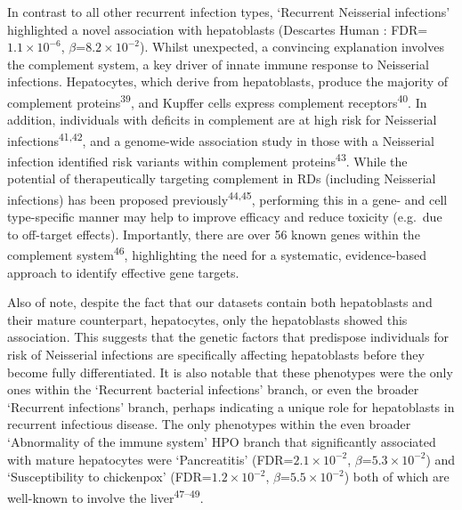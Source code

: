 \documentclass[
]{article}
\begin{document}
In contrast to all other recurrent infection types, `Recurrent
Neisserial infections' highlighted a novel association with hepatoblasts
(Descartes Human : FDR=\(1.1 \times 10^{-6}\),
\(\beta\)=\(8.2 \times 10^{-2}\)). Whilst unexpected, a convincing
explanation involves the complement system, a key driver of innate
immune response to Neisserial infections. Hepatocytes, which derive from
hepatoblasts, produce the majority of complement
proteins\textsuperscript{39}, and Kupffer cells express complement
receptors\textsuperscript{40}. In addition, individuals with deficits in
complement are at high risk for Neisserial
infections\textsuperscript{41,42}, and a genome-wide association study
in those with a Neisserial infection identified risk variants within
complement proteins\textsuperscript{43}. While the potential of
therapeutically targeting complement in RDs (including Neisserial
infections) has been proposed previously\textsuperscript{44,45},
performing this in a gene- and cell type-specific manner may help to
improve efficacy and reduce toxicity (e.g.~due to off-target effects).
Importantly, there are over 56 known genes within the complement
system\textsuperscript{46}, highlighting the need for a systematic,
evidence-based approach to identify effective gene targets.

Also of note, despite the fact that our datasets contain both
hepatoblasts and their mature counterpart, hepatocytes, only the
hepatoblasts showed this association. This suggests that the genetic
factors that predispose individuals for risk of Neisserial infections
are specifically affecting hepatoblasts before they become fully
differentiated. It is also notable that these phenotypes were the only
ones within the `Recurrent bacterial infections' branch, or even the
broader `Recurrent infections' branch, perhaps indicating a unique role
for hepatoblasts in recurrent infectious disease. The only phenotypes
within the even broader `Abnormality of the immune system' HPO branch
that significantly associated with mature hepatocytes were
`Pancreatitis' (FDR=\(2.1 \times 10^{-2}\),
\(\beta\)=\(5.3 \times 10^{-2}\)) and `Susceptibility to chickenpox'
(FDR=\(1.2 \times 10^{-2}\), \(\beta\)=\(5.5 \times 10^{-2}\)) both of
which are well-known to involve the liver\textsuperscript{47--49}.
\end{document}
